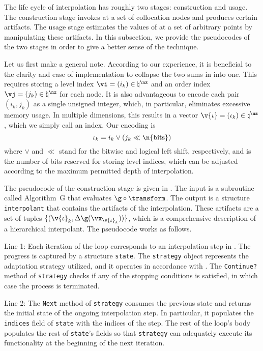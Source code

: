 The life cycle of interpolation has roughly two stages: construction and usage.
The construction stage invokes \g at a set of collocation nodes and produces
certain artifacts. The usage stage estimates the values of \g at a set of
arbitrary points by manipulating these artifacts. In this subsection, we provide
the pseudocodes of the two stages in order to give a better sense of the
technique.

Let us first make a general note. According to our experience, it is beneficial
to the clarity and ease of implementation to collapse the two sums in
 into one. This requires storing a level index $\vi =
(i_k) \in \natural^\nz$ and an order index $\vj = (j_k) \in \natural^\nz$ for
each node. It is also advantageous to encode each pair $(i_k, j_k)$ as a single
unsigned integer, which, in particular, eliminates excessive memory usage. In
multiple dimensions, this results in a vector $\v{\iota} = (\iota_k) \in
\natural^\nz$, which we simply call an index. Our encoding is
\[
  \iota_k = i_k \lor (j_k \ll \n{\mathrm{bits}})
\]
where $\lor$ and $\ll$ stand for the bitwise  and logical left shift,
respectively, and  is the number of bits reserved for storing
level indices, which can be adjusted according to the maximum permitted depth of
interpolation.

The pseudocode of the construction stage is given in .
The input is a subroutine called Algorithm~G that evaluates $\g \circ
\transform$. The output is a structure \texttt{interpolant} that contains the
artifacts of the interpolation. These artifacts are a set of tuples $\{
(\v{\iota}_k, \Delta\g(\vx_{\v{\iota}_k})) \}$, which is a comprehensive
description of a hierarchical interpolant. The pseudocode works as follows.

Line 1: Each iteration of the loop corresponds to an interpolation step \ls in
. The progress is captured by a structure
\texttt{state}. The \texttt{strategy} object represents the adaptation strategy
utilized, and it operates in accordance with . The
\texttt{Continue?} method of \texttt{strategy} checks if any of the stopping
conditions is satisfied, in which case the process is terminated.

Line 2: The \texttt{Next} method of \texttt{strategy} consumes the previous
state and returns the initial state of the ongoing interpolation step. In
particular, it populates the \texttt{indices} field of \texttt{state} with the
indices of the step. The rest of the loop's body populates the rest of
\texttt{state}'s fields so that \texttt{strategy} can adequately execute its
functionality at the beginning of the next iteration.

